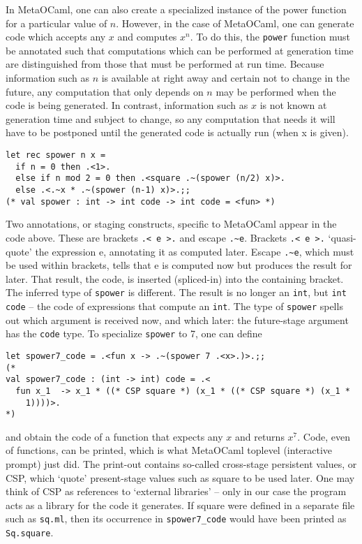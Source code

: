 \documentclass[12pt, titlepage]{article}
\begin{document}
In MetaOCaml, one can also create a specialized instance of the power function 
for a particular value of $n$. However, in the case of MetaOCaml, one can 
generate code which accepts any $x$ and computes $x^n$. To do this, the
\lstinline|power| function must be annotated such that computations which can 
be performed at generation time are distinguished from those that must be 
performed at run time. Because information such as $n$ is available at 
right away and certain not to change in the future, any computation that 
only depends on $n$ may be performed when the code is being generated. In 
contrast, information such as $x$ is not known at generation time and subject 
to change, so any computation that needs it will have to be postponed until the 
generated code is actually run (when x is given).
\begin{lstlisting}
let rec spower n x =
  if n = 0 then .<1>.
  else if n mod 2 = 0 then .<square .~(spower (n/2) x)>.
  else .<.~x * .~(spower (n-1) x)>.;;
(* val spower : int -> int code -> int code = <fun> *)
\end{lstlisting}
Two annotations, or staging constructs, specific to MetaOCaml appear in the 
code above. These are brackets \lstinline|.< e >.| and escape \lstinline|.~e|. 
Brackets \lstinline|.< e >.| `quasi-quote' the expression e, annotating it as 
computed later. Escape \lstinline|.~e|, which must be used within brackets, 
tells that e is computed now but produces the result for later. That result, 
the code, is inserted (spliced-in) into the containing bracket. The inferred 
type of \lstinline|spower| is different. The 
result is no longer an \lstinline|int|, but \lstinline|int code| -- the code of 
expressions that compute an \lstinline|int|. The type of \lstinline|spower| 
spells out which argument is received now, and which later: the future-stage 
argument has the \lstinline|code| type. To specialize \lstinline|spower| to 7, 
one can define
\begin{lstlisting}
let spower7_code = .<fun x -> .~(spower 7 .<x>.)>.;;
(*
val spower7_code : (int -> int) code = .<
  fun x_1  -> x_1 * ((* CSP square *) (x_1 * ((* CSP square *) (x_1 * 
    1))))>.
*)
\end{lstlisting}
and obtain the code of a function that expects any $x$ and returns $x^7$. Code, 
even of functions, can be printed, which is what MetaOCaml toplevel 
(interactive prompt) just did. The print-out contains so-called cross-stage 
persistent values, or CSP, which `quote' present-stage values such as square to 
be used later. One may think of CSP as references to `external libraries' -- 
only in our case the program acts as a library for the code it generates. If 
square were defined in a separate file such as \texttt{sq.ml}, then its 
occurrence in \lstinline|spower7_code| would have been printed as 
\lstinline|Sq.square|.
\end{document}
